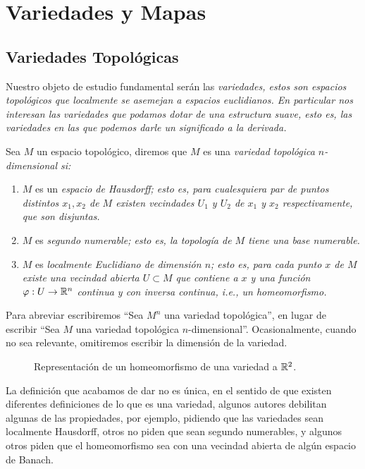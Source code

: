 \chapter{Variedades y Mapas}\label{Capítulo: Variedades y Mapas}
\section{Variedades Topológicas}\label{Sección: Variedades Topologicas}
Nuestro objeto de estudio fundamental serán las \it{variedades}, estos son espacios topológicos que localmente se asemejan a espacios euclidianos. En particular nos interesan las variedades que podamos dotar de una estructura suave, esto es, las variedades en las que podemos darle un significado a la derivada.

\begin{definition}\label{Definición: Variedad Topologica}
	Sea $M$ un espacio topológico, diremos que $M$ es una \it{variedad topológica $n$-dimensional} si:
	\begin{enumerate}
		\item $M$ es un \it{espacio de Hausdorff}; esto es, para cualesquiera par de puntos distintos $x_1,x_2$ de $M$ existen vecindades $U_1$ y $U_2$ de $x_1$ y $x_2$ respectivamente, que son disjuntas.
		\item $M$ es \it{segundo numerable}; esto es, la topología de $M$ tiene una base numerable.
		\item $M$ es \it{localmente Euclidiano} de dimensión $n$; esto es, para cada punto $x$ de $M$ existe una vecindad abierta $U \subset M$ que contiene a $x$ y una función $\varphi: U \to \mathbb{R}^n$ continua y con inversa continua, i.e., un \it{homeomorfismo}.
	\end{enumerate}
\end{definition}

Para abreviar escribiremos \enquote{Sea $M^n$ una variedad topológica},  en lugar de escribir \enquote{Sea $M$ una variedad topológica $n$-dimensional}. Ocasionalmente, cuando no sea relevante, omitiremos escribir la dimensión de la variedad.

\begin{figure}[h!]
	\begin{center}
		
		\caption{Representación de un homeomorfismo de una variedad a $\mathbb{R}^{2}$.}
	\end{center}
\end{figure}

La definición que acabamos de dar no es única, en el sentido de que existen diferentes definiciones de lo que es una variedad, algunos autores debilitan algunas de las propiedades, por ejemplo, pidiendo que las variedades sean localmente Hausdorff, otros no piden que sean segundo numerables, y algunos otros piden que el homeomorfismo sea con una vecindad abierta de algún espacio de Banach.

